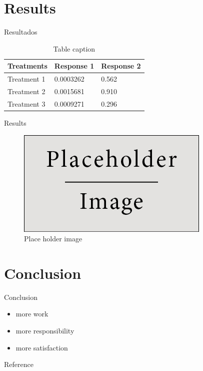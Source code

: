 \documentclass[9pt]{beamer}
\begin{document}
\section{Results}
\begin{frame}{Resultados}
  \begin{table}
    \begin{tabular}{l l l}
      \toprule
      \textbf{Treatments} & \textbf{Response 1} & \textbf{Response 2}\\
      \midrule
      Treatment 1 & 0.0003262 & 0.562 \\
      Treatment 2 & 0.0015681 & 0.910 \\
      Treatment 3 & 0.0009271 & 0.296 \\
      \bottomrule
    \end{tabular}
    \caption{Table caption}
  \end{table}
\end{frame}

\begin{frame}{Results}
      
  \begin{figure}
      \centering
      \includegraphics[width=.7\textwidth]{placeholder}
      \caption{Place holder image}
  \end{figure}

\end{frame}

\section{Conclusion}
\begin{frame}{Conclusion}
  \begin{itemize}
    \item more work
    \medskip
    \item more responsibility
    \medskip
    \item more satisfaction
  \end{itemize}
    
\end{frame}

\nocite{*}
\begin{frame}[allowframebreaks]{Reference}


\end{frame}
\end{document}
